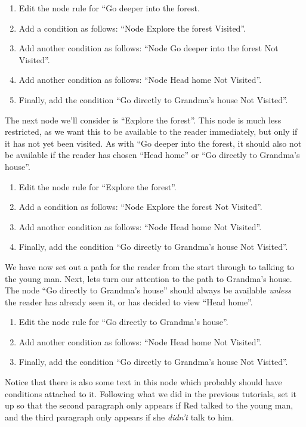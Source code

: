 \documentclass{article}
\begin{document}
\begin{enumerate}
  \item Edit the node rule for ``Go deeper into the forest.
  \item Add a condition as follows: ``Node Explore the forest Visited''.
  \item Add another condition as follows: ``Node Go deeper into the forest Not
  Visited''.
  \item Add another condition as follows: ``Node Head home Not
  Visited''.
  \item Finally, add the condition ``Go directly to Grandma's house Not
  Visited''.
\end{enumerate}

The next node we'll consider is ``Explore the forest''. This node is much less
restricted, as we want this to be available to the reader immediately, but only
if it has not yet been visited. As with ``Go deeper into the forest, it should
also not be available if the reader has chosen ``Head home'' or ``Go directly
to Grandma's house''.

\begin{enumerate}
  \item Edit the node rule for ``Explore the forest''.
  \item Add a condition as follows: ``Node Explore the forest Not Visited''.
  \item Add another condition as follows: ``Node Head home Not
  Visited''.
  \item Finally, add the condition ``Go directly to Grandma's house Not
  Visited''.
\end{enumerate}

We have now set out a path for the reader from the start through to talking to
the young man. Next, lets turn our attention to the path to Grandma's house.
The node ``Go directly to Grandma's house'' should always be available
\textit{unless} the reader has already seen it, or has decided to view ``Head
home''.

\begin{enumerate}
  \item Edit the node rule for ``Go directly to Grandma's house''.
  \item Add another condition as follows: ``Node Head home Not
  Visited''.
  \item Finally, add the condition ``Go directly to Grandma's house Not
  Visited''.
\end{enumerate}

Notice that there is also some text in this node which probably should have
conditions attached to it. Following what we did in the previous tutorials, set
it up so that the second paragraph only appears if Red talked to the young man,
and the third paragraph only appears if she \textit{didn't} talk to him.
\end{document}
